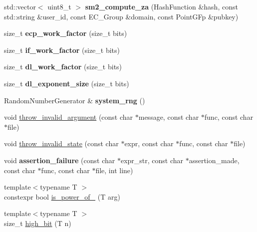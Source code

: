 \begin{DoxyCompactItemize}
std\+::vector$<$ uint8\+\_\+t $>$ {\bfseries sm2\+\_\+compute\+\_\+za} (Hash\+Function \&hash, const std\+::string \&user\+\_\+id, const E\+C\+\_\+\+Group \&domain, const Point\+G\+Fp \&pubkey)
\item 
\mbox{\label{namespace_botan_a052be30bea341e348a9799089e9487a1}} 
size\+\_\+t {\bfseries ecp\+\_\+work\+\_\+factor} (size\+\_\+t bits)
\item 
\mbox{\label{namespace_botan_ab39d3f87c846b73489224288fed48816}} 
size\+\_\+t {\bfseries if\+\_\+work\+\_\+factor} (size\+\_\+t bits)
\item 
\mbox{\label{namespace_botan_a3ad494d424e7cb89e7bf62d64858099d}} 
size\+\_\+t {\bfseries dl\+\_\+work\+\_\+factor} (size\+\_\+t bits)
\item 
\mbox{\label{namespace_botan_a68c03a0ad579b6f211a02d53f0f66477}} 
size\+\_\+t {\bfseries dl\+\_\+exponent\+\_\+size} (size\+\_\+t bits)
\item 
\mbox{\label{namespace_botan_a8626e977565dc7b6ee31fb9e3d772764}} 
Random\+Number\+Generator \& {\bfseries system\+\_\+rng} ()
\item 
void \mbox{\hyperlink{namespace_botan_aaf096546028928a2d760aa504a9a2a74}{throw\+\_\+invalid\+\_\+argument}} (const char $\ast$message, const char $\ast$func, const char $\ast$file)
\item 
void \mbox{\hyperlink{namespace_botan_ad46752d75e4f165d48d1ab2c5c33033b}{throw\+\_\+invalid\+\_\+state}} (const char $\ast$expr, const char $\ast$func, const char $\ast$file)
\item 
\mbox{\label{namespace_botan_aea2929788bbcbcd1783f96d26ecabdba}} 
void {\bfseries assertion\+\_\+failure} (const char $\ast$expr\+\_\+str, const char $\ast$assertion\+\_\+made, const char $\ast$func, const char $\ast$file, int line)
\item 
{\footnotesize template$<$typename T $>$ }\\constexpr bool \mbox{\hyperlink{namespace_botan_aeab1f8b408a2ea772778740017bddcd5}{is\+\_\+power\+\_\+of\+\_}} (T arg)
\item 
{\footnotesize template$<$typename T $>$ }\\size\+\_\+t \mbox{\hyperlink{namespace_botan_ad6c09360d3936ba7077b2d8b14d6cbaa}{high\+\_\+bit}} (T n)

\end{DoxyCompactItemize}
